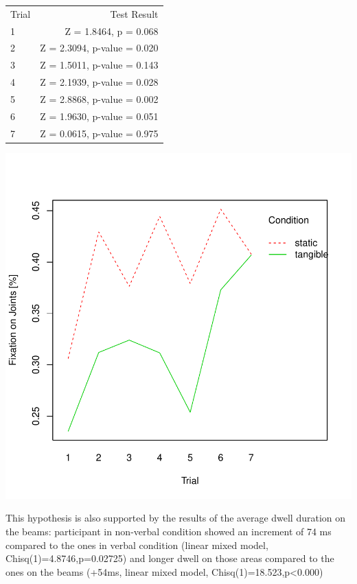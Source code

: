 \documentclass{article}
\begin{document}
\begin{table}[h!]
  \begin{center}
    \begin{tabular}{| l | r |}
    \hline
    Trial & Test Result\\
    1 & Z = 1.8464, p = 0.068\\
    2 & Z = 2.3094, p-value = 0.020\\
    3 & Z = 1.5011, p-value = 0.143\\
    4 & Z = 2.1939, p-value = 0.028\\
    5 & Z = 2.8868, p-value = 0.002\\
    6 & Z = 1.9630, p-value = 0.051\\
    7 & Z = 0.0615, p-value = 0.975\\
    \hline
    \end{tabular}
  \end{center}
\end{table}
\includegraphics{Report_Draft-003}

This hypothesis is also supported by the results of the average dwell duration on the beams: participant in non-verbal condition showed an increment of 74 ms compared to the ones in verbal condition (linear mixed model, Chisq(1)=4.8746,p=0.02725) and longer dwell on those areas compared to the ones on the beams (+54ms, linear mixed model, Chisq(1)=18.523,p<0.000) 
\end{document}
